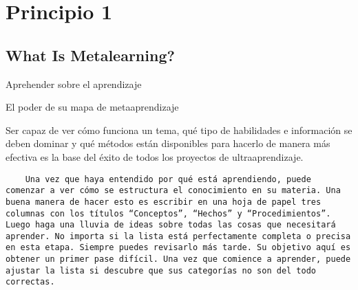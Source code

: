 \section{Principio 1}

\subsection{What Is Metalearning?}

Aprehender sobre el aprendizaje

El poder de su mapa de metaaprendizaje

Ser capaz de ver c\'omo funciona un tema, qu\'e tipo de habilidades e informaci\'on se deben dominar y qu\'e m\'etodos est\'an disponibles para hacerlo de manera m\'as efectiva es la base del \'exito de todos los proyectos de ultraaprendizaje.

\begin{verbatim}
	Una vez que haya entendido por qué está aprendiendo, puede comenzar a ver cómo se estructura el conocimiento en su materia. Una buena manera de hacer esto es escribir en una hoja de papel tres columnas con los títulos “Conceptos”, “Hechos” y “Procedimientos”. Luego haga una lluvia de ideas sobre todas las cosas que necesitará aprender. No importa si la lista está perfectamente completa o precisa en esta etapa. Siempre puedes revisarlo más tarde. Su objetivo aquí es obtener un primer pase difícil. Una vez que comience a aprender, puede ajustar la lista si descubre que sus categorías no son del todo correctas.
\end{verbatim}

